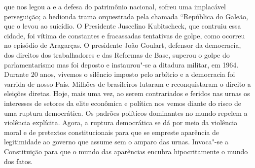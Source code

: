 que nos legou a  e a defesa do patrimônio nacional, sofreu uma
implacável perseguição; a hedionda trama orquestrada pela chamada
``República do Galeão, que o levou ao suicídio. O Presidente Juscelino
Kubitscheck, que contruiu essa cidade, foi vítima de constantes e
fracassadas tentativas de golpe, como ocorreu no episódio de Aragarças.
O presidente João Goulart, defensor da democracia, dos direitos dos
trabalhadores e das Reformas de Base, superou o golpe do parlamentarismo
mas foi deposto e instaurou"-se a ditadura militar, em 1964. Durante 20
anos, vivemos o silêncio imposto pelo arbítrio e a democracia foi
varrida de nosso País. Milhões de brasileiros lutaram e reconquistaram o
direito a eleições diretas. Hoje, mais uma vez, ao serem contrariados e
feridos nas urnas os interesses de setores da elite econômica e política
nos vemos diante do risco de uma ruptura democrática. Os padrões
políticos dominantes no mundo repelem a violência explícita. Agora, a
ruptura democrática se dá por meio da violência moral e de pretextos
constitucionais para que se empreste aparência de legitimidade ao
governo que assume sem o amparo das urnas. Invoca"-se a Constituição para
que o mundo das aparências encubra hipocritamente o mundo dos fatos.

